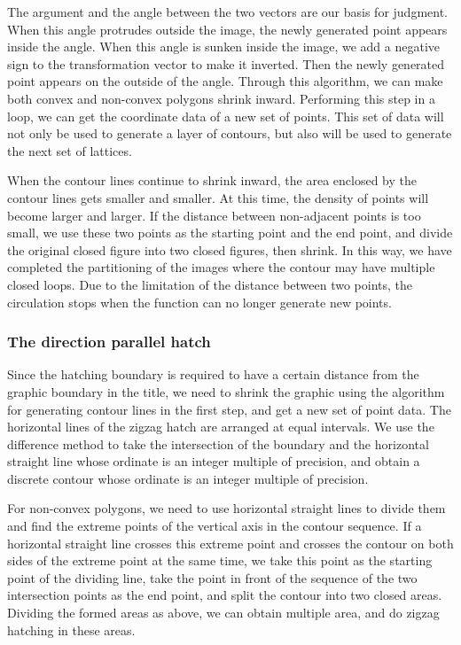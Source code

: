 \documentclass{apmcmthesis}
\begin{document}
The argument and the angle between the two vectors are our basis for judgment. When this angle protrudes outside the image, the newly generated point appears inside the angle. When this angle is sunken inside the image, we add a negative sign to the transformation vector to make it inverted. Then the newly generated point appears on the outside of the angle. Through this algorithm, we can make both convex and non-convex polygons shrink inward. Performing this step in a loop, we can get the coordinate data of a new set of points. This set of data will not only be used to generate a layer of contours, but also will be used to generate the next set of lattices.


When the contour lines continue to shrink inward, the area enclosed by the contour lines gets smaller and smaller. At this time, the density of points will become larger and larger. If the distance between non-adjacent points is too small, we use these two points as the starting point and the end point, and divide the original closed figure into two closed figures, then shrink. In this way, we have completed the partitioning of the images where the contour may have multiple closed loops. Due to the limitation of the distance between two points, the circulation stops when the function can no longer generate new points.


\subsubsection{The direction parallel hatch}


Since the hatching boundary is required to have a certain distance from the graphic boundary in the title, we need to shrink the graphic using the algorithm for generating contour lines in the first step, and get a new set of point data. The horizontal lines of the zigzag hatch are arranged at equal intervals. We use the difference method to take the intersection of the boundary and the horizontal straight line whose ordinate is an integer multiple of precision, and obtain a discrete contour whose ordinate is an integer multiple of precision.


For non-convex polygons, we need to use horizontal straight lines to divide them and find the extreme points of the vertical axis in the contour sequence. If a horizontal straight line crosses this extreme point and crosses the contour on both sides of the extreme point at the same time, we take this point as the starting point of the dividing line, take the point in front of the sequence of the two intersection points as the end point, and split the contour into two closed areas. Dividing the formed areas as above, we can obtain multiple area, and do zigzag hatching in these areas.
\end{document}

